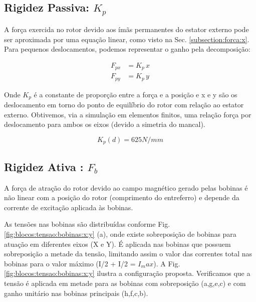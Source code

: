 \subsection{Rigidez Passiva: $K_p$}

A força exercida no rotor devido aos ímãs permanentes do estator externo pode ser aproximada por uma equação linear, como visto na Sec. \ref{subsection:forca:x}. Para pequenos deslocamentos, podemos representar o ganho pela decomposição:

\begin{align}
	F_{px} &= K_p \, x \\
	F_{py} &= K_p \, y 
\end{align}

Onde $K_p$ é a constante de proporção entre a força e a posição e x e y são os deslocamento em torno do ponto de equilíbrio do rotor com relação ao estator externo. Obtivemos, via a simulação em elementos finitos, uma relação força por deslocamento para ambos os eixos (devido a simetria do mancal). 

\begin{equation}
 K_p(d) = 625 N/mm 
\end{equation}

\subsection{Rigidez Ativa : $F_b$}

A força de atração do rotor devido ao campo magnético gerado pelas bobinas é não linear com a posição do rotor (comprimento do entreferro) e depende da corrente de excitação aplicada às bobinas.  

As tensões nas bobinas são distribuídas conforme Fig. \ref{fig:blocos:tensao:bobinas:x:y} (a), onde existe sobreposição de bobinas para atuação em diferentes eixos (X e Y). É aplicada nas bobinas que possuem sobreposição a metade da tensão, limitando assim o valor das correntes total nas bobinas para o valor máximo (I/2 + I/2 = $I_max$). A Fig. \ref{fig:blocos:tensao:bobinas:x:y} ilustra a configuração proposta. Verificamos que a tensão é aplicada em metade para as bobinas com sobreposição (a,g,e,c) e com ganho unitário nas bobinas principais (h,f,c,b). 

